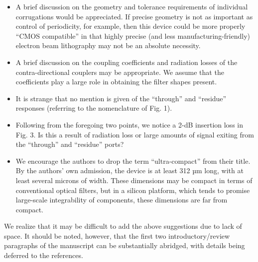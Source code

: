 \documentclass[]{article}
\begin{document}
\begin{itemize}
\item A brief discussion on the geometry and tolerance requirements of individual corrugations would be appreciated. If precise geometry is not as important as control of periodicity, for example, then this device could be more properly “CMOS compatible” in that highly precise (and less manufacturing-friendly) electron beam lithography may not be an absolute necessity.

\item A brief discussion on the coupling coefficients and radiation losses of the contra-directional couplers may be appropriate. We assume that the coefficients play a large role in obtaining the filter shapes present.

\item It is strange that no mention is given of the “through” and “residue” responses (referring to the nomenclature of Fig. 1).

\item Following from the foregoing two points, we notice a 2-dB insertion loss in Fig. 3. Is this a result of radiation loss or large amounts of signal exiting from the “through” and “residue” ports?

\item We encourage the authors to drop the term “ultra-compact” from their title. By the authors’ own admission, the device is at least 312 µm long, with at least several microns of width. These dimensions may be compact in terms of conventional optical filters, but in a silicon platform, which tends to promise large-scale integrability of components, these dimensions are far from compact.
\end{itemize}


We realize that it may be difficult to add the above suggestions due to lack of space. It should be noted, however, that the first two introductory/review paragraphs of the manuscript can be substantially abridged, with details being deferred to the references.
\end{document}
